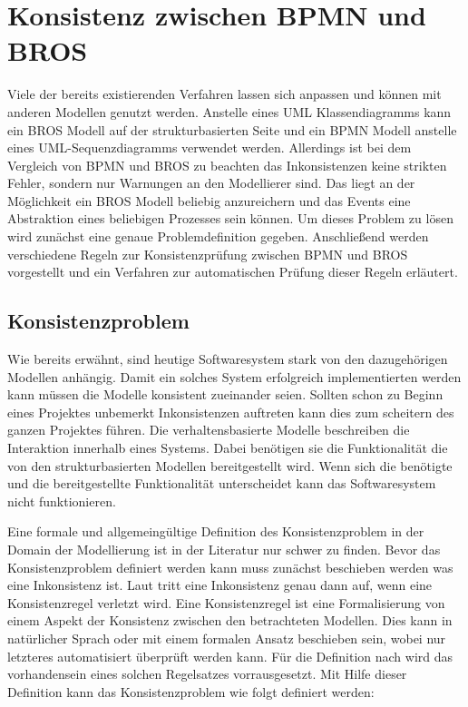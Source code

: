 \chapter{Konsistenz zwischen BPMN und BROS}

Viele der bereits existierenden Verfahren lassen sich anpassen und können mit anderen Modellen genutzt werden. 
Anstelle eines UML Klassendiagramms kann ein BROS Modell auf der strukturbasierten Seite und ein BPMN Modell anstelle eines UML-Sequenzdiagramms verwendet werden.
Allerdings ist bei dem Vergleich von BPMN und BROS zu beachten das Inkonsistenzen keine strikten Fehler, sondern nur Warnungen an den Modellierer sind.
Das liegt an der Möglichkeit ein BROS Modell beliebig anzureichern und das Events eine Abstraktion eines beliebigen Prozesses sein können.
Um dieses Problem zu lösen wird zunächst eine genaue Problemdefinition gegeben.
Anschließend werden verschiedene Regeln zur Konsistenzprüfung zwischen BPMN und BROS vorgestellt und ein Verfahren zur automatischen Prüfung dieser Regeln erläutert.

\section{Konsistenzproblem}

Wie bereits erwähnt, sind heutige Softwaresystem stark von den dazugehörigen Modellen anhängig.
Damit ein solches System erfolgreich implementierten werden kann müssen die Modelle konsistent zueinander seien.
Sollten schon zu Beginn eines Projektes unbemerkt Inkonsistenzen auftreten kann dies zum scheitern des ganzen Projektes führen.
Die verhaltensbasierte Modelle beschreiben die Interaktion innerhalb eines Systems.
Dabei benötigen sie die Funktionalität die von den strukturbasierten Modellen bereitgestellt wird.
Wenn sich die benötigte und die bereitgestellte Funktionalität unterscheidet kann das Softwaresystem nicht funktionieren.

Eine formale und allgemeingültige Definition des Konsistenzproblem in der Domain der Modellierung ist in der Literatur nur schwer zu finden.
Bevor das Konsistenzproblem definiert werden kann muss zunächst beschieben werden was eine Inkonsistenz ist.
Laut \cite{Nuseibeh1996} tritt eine Inkonsistenz genau dann auf, wenn eine Konsistenzregel verletzt wird.
Eine Konsistenzregel ist eine Formalisierung von einem Aspekt der Konsistenz zwischen den betrachteten Modellen.
Dies kann in natürlicher Sprach oder mit einem formalen Ansatz beschieben sein, wobei nur letzteres automatisiert überprüft werden kann.
Für die Definition nach \cite{Nuseibeh1996} wird das vorhandensein eines solchen Regelsatzes vorrausgesetzt.
Mit Hilfe dieser Definition kann das Konsistenzproblem wie folgt definiert werden:


